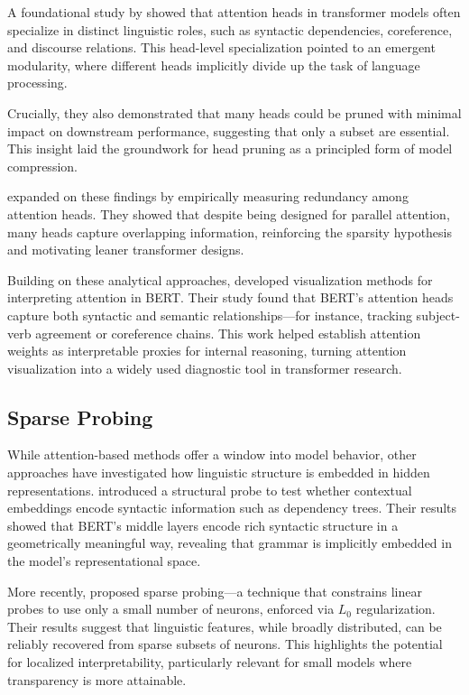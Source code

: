 A foundational study by \citet{voita2019analyzing} showed that attention heads in transformer models often specialize in distinct linguistic roles, such as syntactic dependencies, coreference, and discourse relations. This head-level specialization pointed to an emergent modularity, where different heads implicitly divide up the task of language processing.

Crucially, they also demonstrated that many heads could be pruned with minimal impact on downstream performance, suggesting that only a subset are essential. This insight laid the groundwork for head pruning as a principled form of model compression.

\citet{michel2019sixteen} expanded on these findings by empirically measuring redundancy among attention heads. They showed that despite being designed for parallel attention, many heads capture overlapping information, reinforcing the sparsity hypothesis and motivating leaner transformer designs.

Building on these analytical approaches, \citet{clark2019does} developed visualization methods for interpreting attention in BERT. Their study found that BERT's attention heads capture both syntactic and semantic relationships—for instance, tracking subject-verb agreement or coreference chains. This work helped establish attention weights as interpretable proxies for internal reasoning, turning attention visualization into a widely used diagnostic tool in transformer research.

\subsection{Sparse Probing}

While attention-based methods offer a window into model behavior, other approaches have investigated how linguistic structure is embedded in hidden representations. \citet{hewitt2019structural} introduced a structural probe to test whether contextual embeddings encode syntactic information such as dependency trees. Their results showed that BERT's middle layers encode rich syntactic structure in a geometrically meaningful way, revealing that grammar is implicitly embedded in the model's representational space.

More recently, \citet{gurnee2023finding} proposed sparse probing—a technique that constrains linear probes to use only a small number of neurons, enforced via $L_0$ regularization. Their results suggest that linguistic features, while broadly distributed, can be reliably recovered from sparse subsets of neurons. This highlights the potential for localized interpretability, particularly relevant for small models where transparency is more attainable.

